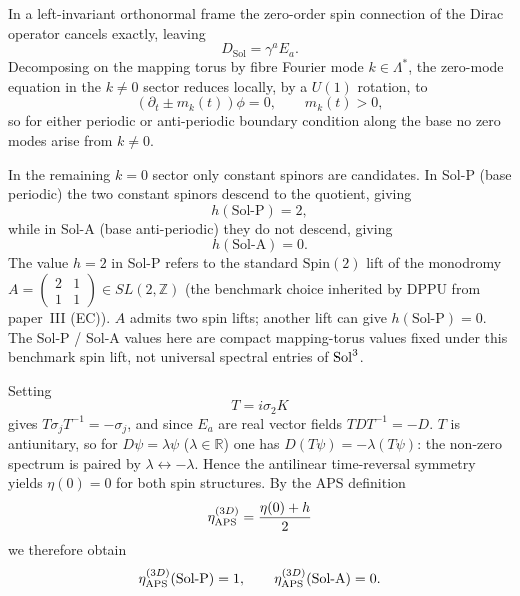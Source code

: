 In a left-invariant orthonormal frame the zero-order spin connection of the
Dirac operator cancels exactly, leaving
\begin{equation}
  D_{\mathrm{Sol}} = \gamma^a E_a.
\end{equation}
Decomposing on the mapping torus by fibre Fourier mode $k\in\Lambda^*$, the
zero-mode equation in the $k\neq 0$ sector reduces locally, by a $U(1)$
rotation, to
\begin{equation}
  (\partial_t \pm m_k(t))\phi = 0, \qquad m_k(t) > 0,
\end{equation}
so for either periodic or anti-periodic boundary condition along the base
no zero modes arise from $k\neq 0$.

In the remaining $k = 0$ sector only constant spinors are candidates.  In
Sol-P (base periodic) the two constant spinors descend to the quotient,
giving
\begin{equation}
  h(\text{Sol-P}) = 2,
\end{equation}
while in Sol-A (base anti-periodic) they do not descend, giving
\begin{equation}
  h(\text{Sol-A}) = 0.
\end{equation}
The value $h = 2$ in Sol-P refers to the standard $\mathrm{Spin}(2)$ lift of
the monodromy
$A = \left(\begin{smallmatrix}2 & 1 \\ 1 & 1\end{smallmatrix}\right)\in SL(2,\mathbb{Z})$
(the benchmark choice inherited by DPPU from paper~III (EC)).  $A$ admits
two spin lifts; another lift can give $h(\text{Sol-P}) = 0$.  The Sol-P /
Sol-A values here are compact mapping-torus values fixed under this
benchmark spin lift, not universal spectral entries of $\mathrm{Sol}^3$.

Setting
\begin{equation}
  T = i\sigma_2 K
\end{equation}
gives $T\sigma_j T^{-1} = -\sigma_j$, and since $E_a$ are real vector fields
$T D T^{-1} = -D$.  $T$ is antiunitary, so for $D\psi = \lambda\psi$
($\lambda\in\mathbb{R}$) one has $D(T\psi) = -\lambda(T\psi)$: the non-zero
spectrum is paired by $\lambda\leftrightarrow -\lambda$.  Hence the
antilinear time-reversal symmetry yields $\eta(0) = 0$ for both spin
structures.  By the APS definition
\begin{equation}
  \eta_{\mathrm{APS}}^{(3D)} = \frac{\eta(0) + h}{2}
\end{equation}
we therefore obtain
\begin{equation}
  \eta_{\mathrm{APS}}^{(3D)}(\text{Sol-P}) = 1, \qquad
  \eta_{\mathrm{APS}}^{(3D)}(\text{Sol-A}) = 0.
\end{equation}

